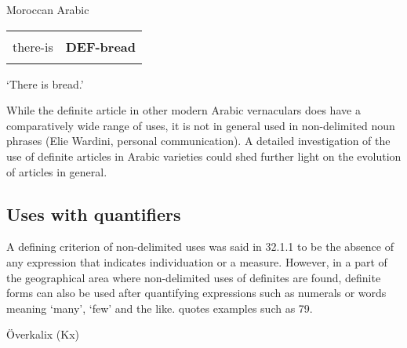 \begin{listWWNumileveli}
\item {}

\begin{styleExample}
Moroccan Arabic

\end{styleExample}

\end{listWWNumileveli}

\begin{tabular}{ll}
\lsptoprule
\multicolumn{2}{l}{K\=ain

}\\
there-is & {\bfseries DEF-bread}\\
\lspbottomrule
\end{tabular}

\begin{styleTranslation}
‘There is bread.’

\end{styleTranslation}

\begin{styleBodyTextFirst}
While the definite article in other modern Arabic vernaculars does have a comparatively wide range of uses, it is not in general used in non-delimited noun phrases (Elie Wardini, personal communication). A detailed investigation of the use of definite articles in Arabic varieties could shed further light on the evolution of articles in general.

\end{styleBodyTextFirst}

\subsection{\rmfamily Uses with quantifiers}
\label{bkm:Ref114303795}
\begin{styleBodyTextFirst}
A defining criterion of non-delimited uses was said in 32.1.1 to be the absence of any expression that indicates individuation or a measure. However, in a part of the geographical area where non-delimited uses of definites are found, definite forms can also be used after quantifying expressions such as numerals or words meaning ‘many’, ‘few’ and the like. \citet{Delsing2003a} quotes examples such as 79.

\end{styleBodyTextFirst}

\begin{listWWNumileveli}
\item {}

\begin{styleExample}
\label{bkm:Ref159664857}\label{bkm:Ref64458018}Överkalix (Kx) 

\end{styleExample}

\end{listWWNumileveli}

